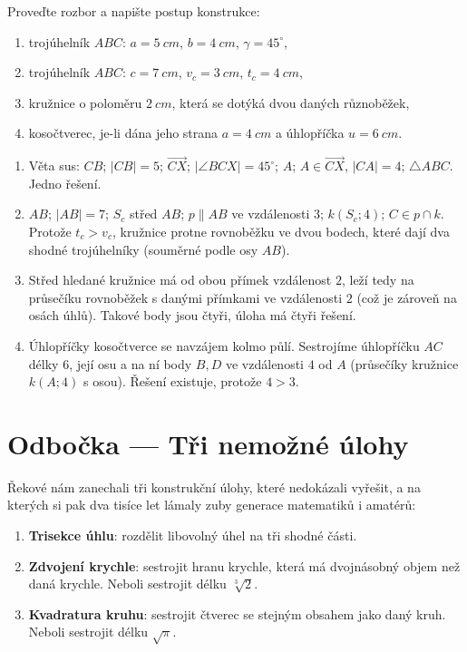 \begin{problem}
  Proveďte rozbor a napište postup konstrukce:
  \begin{enumerate}[label=(\alph*)]
    \item trojúhelník $ABC$: $a = 5\ \si{cm}$, $b = 4\ \si{cm}$, $\gamma = 45^\circ$,
    \item trojúhelník $ABC$: $c = 7\ \si{cm}$, $v_c = 3\ \si{cm}$, $t_c = 4\ \si{cm}$,
    \item kružnice o poloměru $2\ \si{cm}$, která se dotýká dvou daných různoběžek,
    \item kosočtverec, je-li dána jeho strana $a = 4\ \si{cm}$ a úhlopříčka $u = 6\ \si{cm}$.
  \end{enumerate}
\end{problem}

\begin{solution}
  \begin{enumerate}[label=(\alph*)]
    \item Věta sus: $CB$; $|CB| = 5$; $\overrightarrow{CX}$; $|\angle BCX| = 45^\circ$; $A$; $A\in\overrightarrow{CX}$, $|CA| = 4$; $\triangle ABC$. Jedno řešení.
    \item $AB$; $|AB| = 7$; $S_c$ střed $AB$; $p\parallel AB$ ve vzdálenosti $3$; $k(S_c; 4)$; $C\in p\cap k$. Protože $t_c > v_c$, kružnice protne rovnoběžku ve dvou bodech, které dají dva shodné trojúhelníky (souměrné podle osy $AB$).
    \item Střed hledané kružnice má od obou přímek vzdálenost $2$, leží tedy na průsečíku rovnoběžek s danými přímkami ve vzdálenosti $2$ (což je zároveň na osách úhlů). Takové body jsou čtyři, úloha má čtyři řešení.
    \item Úhlopříčky kosočtverce se navzájem kolmo půlí. Sestrojíme úhlopříčku $AC$ délky $6$, její osu a na ní body $B, D$ ve vzdálenosti $4$ od $A$ (průsečíky kružnice $k(A; 4)$ s osou). Řešení existuje, protože $4 > 3$.
  \end{enumerate}
\end{solution}

\section{Odbočka --- Tři nemožné úlohy}\label{sec:nemozne-ulohy}

Řekové nám zanechali tři konstrukční úlohy, které nedokázali vyřešit, a na kterých si pak dva tisíce let lámaly zuby generace matematiků i amatérů:
\begin{enumerate}
  \item \textbf{Trisekce úhlu}: rozdělit libovolný úhel na tři shodné části.
  \item \textbf{Zdvojení krychle}: sestrojit hranu krychle, která má dvojnásobný objem než daná krychle. Neboli sestrojit délku $\sqrt[3]{2}$.
  \item \textbf{Kvadratura kruhu}: sestrojit čtverec se stejným obsahem jako daný kruh. Neboli sestrojit délku $\sqrt{\pi}$.
\end{enumerate}

